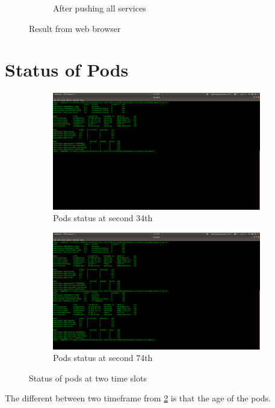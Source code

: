 \documentclass[11pt,a4paper]{report}
\begin{document}
\begin{figure}[p]
\begin{subfigure}[b]{\linewidth}
    		\caption{After pushing all services}
  		\end{subfigure}
  		\caption{Result from web browser}
  		\label{fig:dockerhubrepo}
	\end{figure}

	\newpage
	\section{Status of Pods}
	\label{sec:stpod}
  	\begin{figure}[h!]
		\centering
  		\begin{subfigure}[b]{0.4\linewidth}
  		\includegraphics[width=\linewidth]{status-at34.png}
    		\caption{Pods status at second 34th}
  		\end{subfigure}
  		\begin{subfigure}[b]{0.4\linewidth}
    		\includegraphics[width=\linewidth]{status-at74.png}
    		\caption{Pods status at second 74th}
  		\end{subfigure}
  		\caption{Status of pods at two time slots}
  		\label{fig:podstat}
	\end{figure}
	The different between two timeframe from \ref{fig:podstat} is that the age of the pods.
\end{document}
